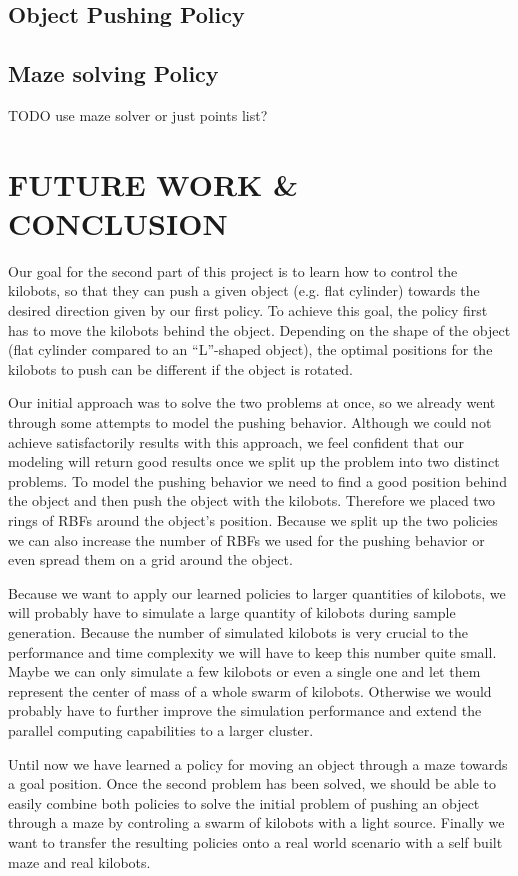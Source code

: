 \documentclass[twoside]{article}
\begin{document}
\subsection{Object Pushing Policy}

\subsection{Maze solving Policy}

TODO use maze solver or just points list?

\section{FUTURE WORK \& CONCLUSION} Our goal for the second part of this project
is to learn how to control the kilobots, so that they can push a given object
(e.g. flat cylinder) towards the desired direction given by our first policy. To
achieve this goal, the policy first has to move the kilobots behind the object.
Depending on the shape of the object (flat cylinder compared to an ``L''-shaped
object), the optimal positions for the kilobots to push can be different if the
object is rotated.

Our initial approach was to solve the two problems at once, so we already went
through some attempts to model the pushing behavior. Although we could not
achieve satisfactorily results with this approach, we feel confident that our
modeling will return good results once we split up the problem into two distinct
problems. To model the pushing behavior we need to find a good position behind
the object and then push the object with the kilobots. Therefore we placed two
rings of RBFs around the object's position. Because we split up the two policies
we can also increase the number of RBFs we used for the pushing behavior or even
spread them on a grid around the object.

Because we want to apply our learned policies to larger quantities of kilobots,
we will probably have to simulate a large quantity of kilobots during sample
generation. Because the number of simulated kilobots is very crucial to the
performance and time complexity we will have to keep this number quite small.
Maybe we can only simulate a few kilobots or even a single one and let them
represent the center of mass of a whole swarm of kilobots. Otherwise we would
probably have to further improve the simulation performance and extend the
parallel computing capabilities to a larger cluster.

Until now we have learned a policy for moving an object through a maze towards a
goal position. Once the second problem has been solved, we should be able to
easily combine both policies to solve the initial problem of pushing an object
through a maze by controling a swarm of kilobots with a light source. Finally we
want to transfer the resulting policies onto a real world scenario with a self
built maze and real kilobots.

 
\end{document}
